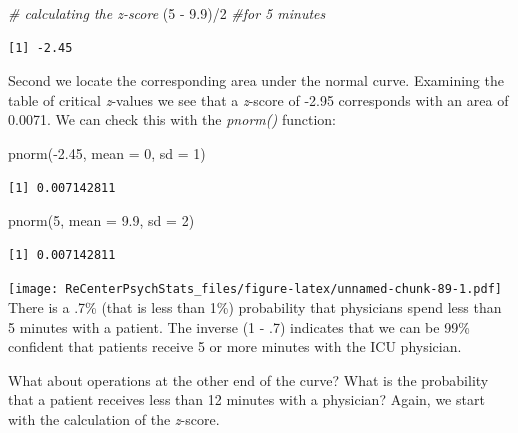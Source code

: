 \documentclass[
  11pt,
]{book}
\newenvironment{Shaded}{\begin{snugshade}}{\end{snugshade}}
\newcommand{\AttributeTok}[1]{\textcolor[rgb]{0.77,0.63,0.00}{#1}}
\newcommand{\CommentTok}[1]{\textcolor[rgb]{0.56,0.35,0.01}{\textit{#1}}}
\newcommand{\DecValTok}[1]{\textcolor[rgb]{0.00,0.00,0.81}{#1}}
\newcommand{\FloatTok}[1]{\textcolor[rgb]{0.00,0.00,0.81}{#1}}
\newcommand{\FunctionTok}[1]{\textcolor[rgb]{0.00,0.00,0.00}{#1}}
\newcommand{\NormalTok}[1]{#1}
\newcommand{\SpecialCharTok}[1]{\textcolor[rgb]{0.00,0.00,0.00}{#1}}
\begin{document}
\begin{Shaded}
\begin{Highlighting}[]
\CommentTok{\# calculating the z{-}score}
\NormalTok{(}\DecValTok{5} \SpecialCharTok{{-}} \FloatTok{9.9}\NormalTok{)}\SpecialCharTok{/}\DecValTok{2}  \CommentTok{\#for 5 minutes}
\end{Highlighting}
\end{Shaded}

\begin{verbatim}
[1] -2.45
\end{verbatim}

Second we locate the corresponding area under the normal curve. Examining the table of critical \emph{z}-values we see that a \emph{z}-score of -2.95 corresponds with an area of 0.0071. We can check this with the \emph{pnorm()} function:

\begin{Shaded}
\begin{Highlighting}[]
\FunctionTok{pnorm}\NormalTok{(}\SpecialCharTok{{-}}\FloatTok{2.45}\NormalTok{, }\AttributeTok{mean =} \DecValTok{0}\NormalTok{, }\AttributeTok{sd =} \DecValTok{1}\NormalTok{)}
\end{Highlighting}
\end{Shaded}

\begin{verbatim}
[1] 0.007142811
\end{verbatim}

\begin{Shaded}
\begin{Highlighting}[]
\FunctionTok{pnorm}\NormalTok{(}\DecValTok{5}\NormalTok{, }\AttributeTok{mean =} \FloatTok{9.9}\NormalTok{, }\AttributeTok{sd =} \DecValTok{2}\NormalTok{)}
\end{Highlighting}
\end{Shaded}

\begin{verbatim}
[1] 0.007142811
\end{verbatim}

\texttt{[image: ReCenterPsychStats\_files/figure-latex/unnamed-chunk-89-1.pdf]}
There is a .7\% (that is less than 1\%) probability that physicians spend less than 5 minutes with a patient. The inverse (1 - .7) indicates that we can be 99\% confident that patients receive 5 or more minutes with the ICU physician.

What about operations at the other end of the curve? What is the probability that a patient receives less than 12 minutes with a physician? Again, we start with the calculation of the \emph{z}-score.
\end{document}
